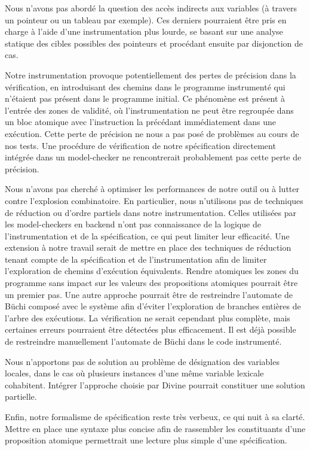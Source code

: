 Nous n'avons pas abordé la question des accès indirects aux variables (à travers
un pointeur ou un tableau par exemple). Ces derniers pourraient être pris en
charge à l'aide d'une instrumentation plus lourde, se basant sur une analyse
statique des cibles possibles des pointeurs et procédant ensuite par disjonction
de cas.

Notre instrumentation provoque potentiellement des pertes de précision dans la
vérification, en introduisant des chemins dans le programme instrumenté qui
n'étaient pas présent dans le programme initial. Ce phénomène est présent à
l'entrée des zones de validité, où l'instrumentation ne peut être regroupée dans
un bloc atomique avec l'instruction la précédant immédiatement dans une
exécution. Cette perte de précision ne nous a pas posé de problèmes au cours de
nos tests. Une procédure de vérification de notre spécification directement
intégrée dans un model-checker ne rencontrerait probablement pas cette perte de
précision.

Nous n'avons pas cherché à optimiser les performances de notre outil ou à
lutter contre l'explosion combinatoire. En particulier, nous n'utilisons pas de
techniques de réduction ou d'ordre partiels dans notre instrumentation. Celles
utilisées par les model-checkers en backend n'ont pas connaissance de la logique
de l'instrumentation et de la spécification, ce qui peut limiter leur
efficacité. Une extension à notre travail serait de mettre en place des
techniques de réduction tenant compte de la spécification et de l'instrumentation
afin de limiter l'exploration de chemins d'exécution équivalents. Rendre
atomiques les zones du programme sans impact sur les valeurs des propositions
atomiques pourrait être un premier pas. Une autre approche pourrait être de
restreindre l'automate de Büchi composé avec le système afin d'éviter
l'exploration de branches entières de l'arbre des exécutions. La vérification ne
serait cependant plus complète, mais certaines erreurs pourraient être détectées
plus efficacement. Il est déjà possible de restreindre manuellement l'automate
de Büchi dans le code instrumenté.

Nous n'apportons pas de solution au problème de désignation des variables
locales, dans le cas où plusieurs instances d'une même variable lexicale
cohabitent. Intégrer l'approche choisie par Divine\cite{Divine_LTL} pourrait
constituer une solution partielle.

Enfin, notre formalisme de spécification reste très verbeux, ce qui nuit à sa
clarté. Mettre en place une syntaxe plus concise afin de rassembler les
constituants d'une proposition atomique permettrait une lecture plus simple d'une
spécification.
